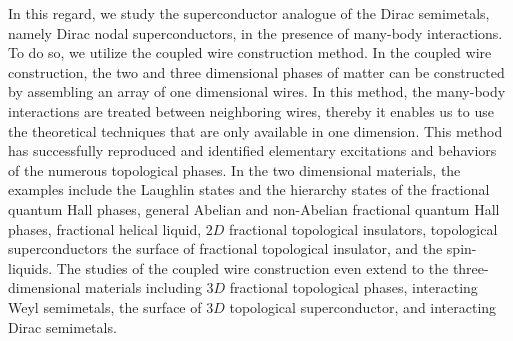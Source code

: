 In this regard, we study the superconductor analogue of the Dirac semimetals, namely Dirac nodal superconductors, in the presence of many-body interactions. To do so, we utilize the coupled wire construction method. In the coupled wire construction, the two and three dimensional phases of matter can be constructed by assembling an array of one dimensional wires. In this method, the many-body interactions are treated between neighboring wires, thereby it enables us to use the theoretical techniques that are only available in one dimension. This method has successfully reproduced and identified elementary excitations and behaviors of the numerous topological phases. In the two dimensional materials, the examples include the Laughlin states\cite{PhysRevLett.50.1395} and the hierarchy states\cite{PhysRevLett.51.605} of the fractional quantum Hall phases\cite{PhysRevLett.88.036401}, general Abelian and non-Abelian fractional quantum Hall phases\cite{PhysRevB.89.085101,PhysRevX.7.031009,Klinovaja2014,Meng2014}, fractional helical liquid{\cite{PhysRevB.89.115402}}, $2D$ fractional topological insulators\cite{PhysRevB.90.205101,PhysRevB.90.115426,PhysRevB.90.201102,PhysRevB.91.205141,PhysRevX.5.011011}, topological superconductors\cite{PhysRevX.4.011036,PhysRevB.89.104523} the surface of fractional topological insulator\cite{PhysRevB.90.201102,PhysRevX.5.011011}, and the spin-liquids\cite{PhysRevB.91.241106,PhysRevB.94.195130,PhysRevB.91.245139}.
The studies of the coupled wire construction even extend to the three-dimensional materials including $3D$ fractional topological phases\cite{PhysRevB.92.195137,PhysRevB.93.195136,Iadecola2017}, interacting Weyl semimetals\cite{PhysRevB.94.155136,0295-5075-102-6-67011,PhysRevB.92.115152,Mross}, the surface of $3D$ topological superconductor\cite{PhysRevB.94.165142}, and interacting Dirac semimetals\cite{Raza2017}.


